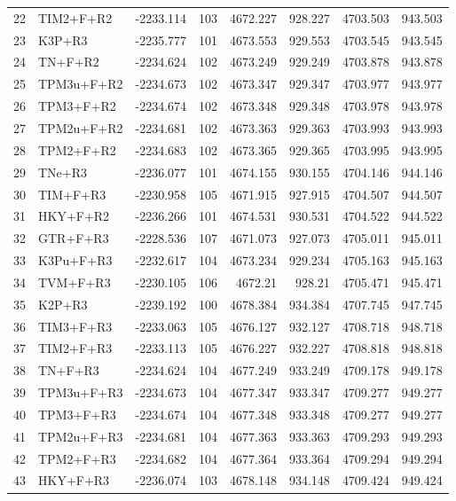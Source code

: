 \begin{longtable}{clrrrrrr}
	22 & TIM2+F+R2 & -2233.114 & 103 & 4672.227 & 928.227 & 4703.503 & 943.503 \\ 
	23 & K3P+R3 & -2235.777 & 101 & 4673.553 & 929.553 & 4703.545 & 943.545 \\ 
	24 & TN+F+R2 & -2234.624 & 102 & 4673.249 & 929.249 & 4703.878 & 943.878 \\ 
	25 & TPM3u+F+R2 & -2234.673 & 102 & 4673.347 & 929.347 & 4703.977 & 943.977 \\ 
	26 & TPM3+F+R2 & -2234.674 & 102 & 4673.348 & 929.348 & 4703.978 & 943.978 \\ 
	27 & TPM2u+F+R2 & -2234.681 & 102 & 4673.363 & 929.363 & 4703.993 & 943.993 \\ 
	28 & TPM2+F+R2 & -2234.683 & 102 & 4673.365 & 929.365 & 4703.995 & 943.995 \\ 
	29 & TNe+R3 & -2236.077 & 101 & 4674.155 & 930.155 & 4704.146 & 944.146 \\ 
	30 & TIM+F+R3 & -2230.958 & 105 & 4671.915 & 927.915 & 4704.507 & 944.507 \\ 
	31 & HKY+F+R2 & -2236.266 & 101 & 4674.531 & 930.531 & 4704.522 & 944.522 \\ 
	32 & GTR+F+R3 & -2228.536 & 107 & 4671.073 & 927.073 & 4705.011 & 945.011 \\ 
	33 & K3Pu+F+R3 & -2232.617 & 104 & 4673.234 & 929.234 & 4705.163 & 945.163 \\ 
	34 & TVM+F+R3 & -2230.105 & 106 & 4672.21 & 928.21 & 4705.471 & 945.471 \\ 
	35 & K2P+R3 & -2239.192 & 100 & 4678.384 & 934.384 & 4707.745 & 947.745 \\ 
	36 & TIM3+F+R3 & -2233.063 & 105 & 4676.127 & 932.127 & 4708.718 & 948.718 \\ 
	37 & TIM2+F+R3 & -2233.113 & 105 & 4676.227 & 932.227 & 4708.818 & 948.818 \\ 
	38 & TN+F+R3 & -2234.624 & 104 & 4677.249 & 933.249 & 4709.178 & 949.178 \\ 
	39 & TPM3u+F+R3 & -2234.673 & 104 & 4677.347 & 933.347 & 4709.277 & 949.277 \\ 
	40 & TPM3+F+R3 & -2234.674 & 104 & 4677.348 & 933.348 & 4709.277 & 949.277 \\ 
	41 & TPM2u+F+R3 & -2234.681 & 104 & 4677.363 & 933.363 & 4709.293 & 949.293 \\ 
	42 & TPM2+F+R3 & -2234.682 & 104 & 4677.364 & 933.364 & 4709.294 & 949.294 \\ 
	43 & HKY+F+R3 & -2236.074 & 103 & 4678.148 & 934.148 & 4709.424 & 949.424 \\ 

\end{longtable}
